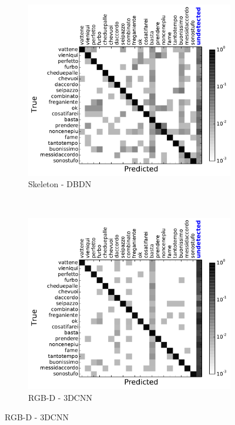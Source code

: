 \begin{figure}[t]
        \centering
        \begin{subfigure}[c]{.36\textwidth}
                \includegraphics[width=\textwidth]{images/cm/cm_sk}
\vspace*{-3mm}
                \caption{Skeleton - DBDN}
                \label{sk_cm}
        \end{subfigure}%
        ~ %

        \begin{subfigure}[c]{0.36\textwidth}
                \includegraphics[width=\textwidth]{images/cm/cm_cnn}
\vspace*{-3mm}
                \caption{RGB-D - 3DCNN}
                \label{cnn_cm}
        \end{subfigure}


\end{figure}
